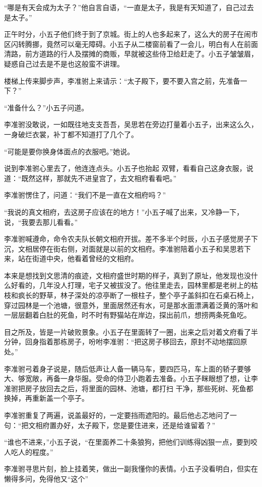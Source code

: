 “哪是有天会成为太子？”他自言自语，“一直是太子，我是有天知道了，自己过去是太子。”

正午时分，小五子他们终于到了京城。街上的人也多起来了，这么大的房子在闹市区闪转腾挪，竟然可以毫无障碍。小五子从二楼窗前看了一会儿，明白有人在前面清路，前方道路的行人及摆摊的商贩，早就被这些侍卫给赶走了。小五子皱皱眉，疑惑自己过去是不是也这般蛮不讲理。

楼梯上传来脚步声，李准驸上来请示：“太子殿下，要不要入宫之前，先准备一下？”

“准备什么？”小五子问道。

李准驸没敢说，一如既往地支支吾吾，吴思若在旁边打量着小五子，出来这么久，一身破烂衣裳，补丁都不知道打了几个了。

“可能是要你换身体面点的衣服吧。”她说。

说到李准驸心里去了，他连连点头。小五子也抬起
双臂，看看自己这身衣服，说道：“既然这样，那就先不进皇宫了，去文相府看看吧。”

李准驸愣住了，问道：“我们不是一直在文相府吗？”

“我说的真文相府，去这房子应该在的地方！”小五子喊了出来，又冷静一下，说，“我要去那儿看看。”

李准驸喊遵命，命令农夫队长朝文相府开拔。差不多半个时辰，小五子感觉房子下沉，文相居停在街右侧，对面就是以前的文相府。李准驸陪着小五子和吴思若下来，站在街道中央，他看着曾经的文相府。

本来是想找到文思清的痕迹，文相府盛世时期的样子，真到了原址，他发现也没什么好看的，几年没人打理，宅子又被拔没了。他往里走去，园林里都是老树上的枯枝和疯长的野草，林子深处的凉亭断了一根柱子，整个亭子盖斜扣在石桌石椅上，穿过园林是一个池塘，很意外，里面居然还有水，可是那水面漂满着泛黄的落叶和一层层翻着白肚的死鱼，时不时有野猫站在岸边，探出前爪，想捞两条死鱼吃。

目之所及，皆是一片破败景象。小五子在里面转了一圈，出来之后对着文府看了半分钟，回身指着那栋房子，吩咐李准驸：“把这房子移回去，原封不动地摆回原处。”

李准驸弓着身子说是，随后低声让人备一辆马车，要四匹马，车上面的轿子要够大、够宽敞，再备一身华服。受命的侍卫小跑着去准备。小五子眯眼想了想，让李准驸把房子放回去之后，将里面的园林、池塘，都打扫
干净，那些死树、死鱼都换掉，再重新盖一个亭子。

李准驸重复了两遍，说盖最好的，一定要挡雨遮阳的。最后他忐忑地问了一句：“把文相府置办好，太子殿下，您是要住进来，还是给谁留着？”

“谁也不进来，”小五子说，“在里面养二十条狼狗，把他们训练得凶狠一点，要到咬人吃人的程度。”

李准驸寻思片刻，脸上挂着笑，做出一副我懂你的表情。小五子没看明白，但实在懒得多问，免得他又“这个”

